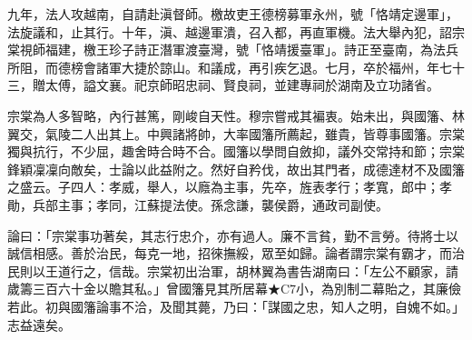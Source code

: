 \begin{pinyinscope}
九年，法人攻越南，自請赴滇督師。檄故吏王德榜募軍永州，號「恪靖定邊軍」，法旋議和，止其行。十年，滇、越邊軍潰，召入都，再直軍機。法大舉內犯，詔宗棠視師福建，檄王珍子詩正潛軍渡臺灣，號「恪靖援臺軍」。詩正至臺南，為法兵所阻，而德榜會諸軍大捷於諒山。和議成，再引疾乞退。七月，卒於福州，年七十三，贈太傅，謚文襄。祀京師昭忠祠、賢良祠，並建專祠於湖南及立功諸省。

宗棠為人多智略，內行甚篤，剛峻自天性。穆宗嘗戒其褊衷。始未出，與國籓、林翼交，氣陵二人出其上。中興諸將帥，大率國籓所薦起，雖貴，皆尊事國籓。宗棠獨與抗行，不少屈，趣舍時合時不合。國籓以學問自斂抑，議外交常持和節；宗棠鋒穎凜凜向敵矣，士論以此益附之。然好自矜伐，故出其門者，成德達材不及國籓之盛云。子四人：孝威，舉人，以廕為主事，先卒，旌表孝行；孝寬，郎中；孝勛，兵部主事；孝同，江蘇提法使。孫念謙，襲侯爵，通政司副使。

論曰：「宗棠事功著矣，其志行忠介，亦有過人。廉不言貧，勤不言勞。待將士以誠信相感。善於治民，每克一地，招徠撫綏，眾至如歸。論者謂宗棠有霸才，而治民則以王道行之，信哉。宗棠初出治軍，胡林翼為書告湖南曰：「左公不顧家，請歲籌三百六十金以贍其私。」曾國籓見其所居幕★C7小，為別制二幕貽之，其廉儉若此。初與國籓論事不洽，及聞其薨，乃曰：「謀國之忠，知人之明，自媿不如。」志益遠矣。


\end{pinyinscope}